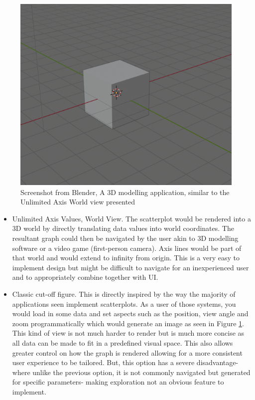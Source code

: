 \begin{figure}[h]
    \centering
    \includegraphics[width=0.7\columnwidth]{author-files/figures/worldnavblender.png}
    \caption{Screenshot from Blender, A 3D modelling application, similar to the Unlimited Axis World view presented}
    \label{fig:MatlabPlot}
\end{figure}

\begin{itemize}
    \item Unlimited Axis Values, World View. The scatterplot would be rendered into a 3D world by directly translating data values into world coordinates. The resultant graph could then be navigated by the user akin to 3D modelling software or a video game (first-person camera). Axis lines would be part of that world and would extend to infinity from origin. This is a very easy to implement design but might be difficult to navigate for an inexperienced user and to appropriately combine together with UI.
    \item Classic cut-off figure. This is directly inspired by the way the majority of applications seen implement scatterplots. As a user of those systems, you would load in some data and set aspects such as the position, view angle and zoom programmatically which would generate an  image as seen in Figure \ref*{fig:MatlabPlot}. This kind of view is not much harder to render but is much more concise as all data can be made to fit in a predefined visual space. This also allows greater control on how the graph is rendered allowing for a more consistent user experience to be tailored. But, this option has a severe disadvantage- where unlike the previous option, it is not commonly navigated but generated for specific parameters- making exploration not an obvious feature to implement.
\end{itemize}

